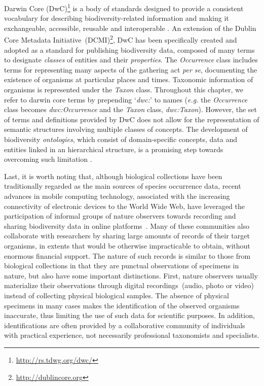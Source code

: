 Darwin Core (DwC)\footnote{\url{http://rs.tdwg.org/dwc/}} is a body of standards designed to provide a consistent vocabulary for describing biodiversity-related information and making it exchangeable, accessible, reusable and interoperable \cite{Wieczorek2012}.
An extension of the Dublin Core Metadata Initiative~(DCMI)\footnote{\url{http://dublincore.org}}, DwC has been specifically created and adopted as a standard for publishing biodiversity data, composed of many terms to designate \textit{classes} of entities and their \textit{properties}.
The \textit{Occurrence} class includes terms for representing many aspects of the gathering act \textit{per se}, documenting the existence of organisms at particular places and times.
Taxonomic information of organisms is represented under the \textit{Taxon} class.
Throughout this chapter, we refer to darwin core terms by prepending `\textit{dwc:}' to names (\textit{e.g.} the \textit{Occurrence} class becomes \textit{dwc:Occurrence} and the \textit{Taxon} class, \textit{dwc:Taxon}).
However, the set of terms and definitions provided by DwC does not allow for the representation of semantic structures involving multiple classes of concepts.
The development of biodiversity \textit{ontologies}, which consist of domain-specific concepts, data and entities linked in an hierarchical structure, is a promising step towards overcoming such limitation \cite{Walls2014}.



Last, it is worth noting that, although biological collections have been traditionally regarded as the main sources of species occurrence data, recent advances in mobile computing technology, associated with the increasing connectivity of electronic devices to the World Wide Web, have leveraged the participation of informal groups of nature observers towards recording and sharing biodiversity data in online platforms~\cite{Silvertown2009}.
Many of these communities also collaborate with researchers by sharing large amounts of records of their target organisms, in extents that would be otherwise impracticable to obtain, without enormous financial support.
The nature of such records is similar to those from biological collections in that they are punctual observations of specimens in nature, but also have some important distinctions.
First, nature observers usually materialize their observations through digital recordings~(audio, photo or video) instead of collecting physical biological samples.
The absence of physical specimens in many cases makes the identification of the observed organisms inaccurate, thus limiting the use of such data for scientific purposes.
In addition, identifications are often provided by a collaborative community of individuals with practical experience, not necessarily professional taxonomists and specialists.

